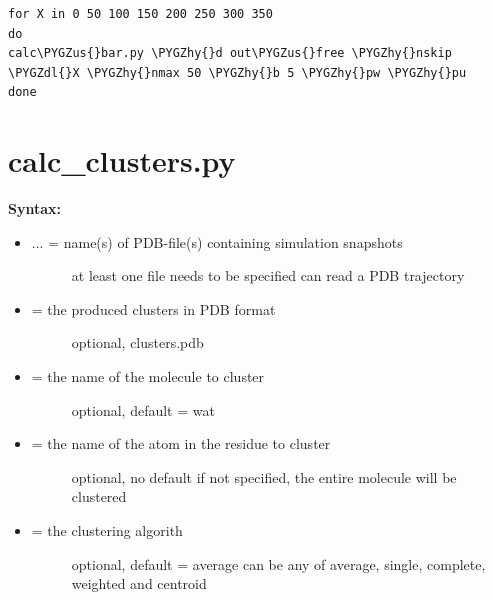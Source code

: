 \documentclass[letterpaper,10pt,english]{sphinxmanual}
\def\PYGZus{\char`\_}
\def\PYGZdl{\char`\$}
\def\PYGZhy{\char`\-}
\begin{document}
\begin{Verbatim}[commandchars=\\\{\}]
for X in 0 50 100 150 200 250 300 350
do
calc\PYGZus{}bar.py \PYGZhy{}d out\PYGZus{}free \PYGZhy{}nskip \PYGZdl{}X \PYGZhy{}nmax 50 \PYGZhy{}b 5 \PYGZhy{}pw \PYGZhy{}pu
done
\end{Verbatim}


\section{calc\_clusters.py}
\label{tools:calc-clusters-py}
\textbf{Syntax:}

\begin{itemize}
\item {} \begin{description}
\item[{ ... = name(s) of PDB-file(s) containing simulation snapshots}] \leavevmode
at least one file needs to be specified
can read a PDB trajectory

\end{description}

\item {} \begin{description}
\item[{ = the produced clusters in PDB format}] \leavevmode
optional, clusters.pdb

\end{description}

\item {} \begin{description}
\item[{ = the name of the molecule to cluster}] \leavevmode
optional, default = wat

\end{description}

\item {} \begin{description}
\item[{ = the name of the atom in the residue to cluster}] \leavevmode
optional, no default
if not specified, the entire molecule will be clustered

\end{description}

\item {} \begin{description}
\item[{ = the clustering algorith}] \leavevmode
optional, default = average
can be any of average, single, complete, weighted and centroid


\end{description}
\end{itemize}
\end{document}

